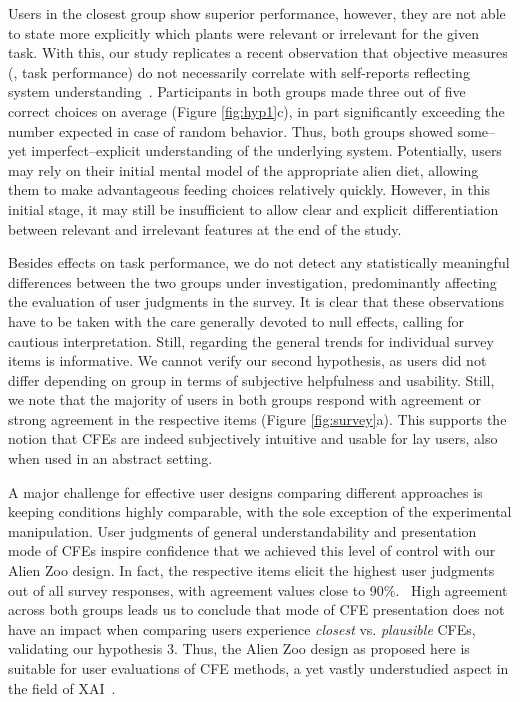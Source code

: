 Users in the closest group show superior performance, however, they are not able to state more explicitly which plants were relevant or irrelevant for the given task. 
With this, our study replicates a recent observation that objective measures (\ie, task performance) do not necessarily correlate with self-reports reflecting system understanding~\citep{van_der_waa_evaluating_2021}.
Participants in both groups made three out of five correct choices on average (Figure \ref{fig:hyp1}c), in part significantly exceeding the number expected in case of random behavior.
Thus, both groups showed some--yet imperfect--explicit understanding of the underlying system.
Potentially, users may rely on their initial mental model of the appropriate alien diet, allowing them to make advantageous feeding choices relatively quickly. However, in this initial stage, it may still be insufficient to allow clear and explicit differentiation between relevant and irrelevant features at the end of the study.

Besides effects on task performance, we do not detect any statistically meaningful differences between the two groups under investigation, predominantly affecting the evaluation of user judgments in the survey. 
It is clear that these observations have to be taken with the care generally devoted to null effects, calling for cautious interpretation. 
Still, regarding the general trends for individual survey items is informative.
We cannot verify our second hypothesis, as users did not differ depending on group in terms of subjective helpfulness and usability. 
Still, we note that the majority of users in both groups respond with agreement or strong agreement in the respective items (Figure \ref{fig:survey}a).
This supports the notion that \glspl{CFE} are indeed subjectively intuitive and usable for lay users, also when used in an abstract setting.

A major challenge for effective user designs comparing different approaches is keeping conditions highly comparable, with the sole exception of the experimental manipulation.
User judgments of general understandability and presentation mode of \glspl{CFE} inspire confidence that we achieved this level of control with our Alien Zoo design. 
In fact, the respective items elicit the highest user judgments out of all survey responses, with agreement values close to 90\%.%
~High agreement across both groups leads us to conclude that mode of \gls{CFE} presentation does not have an impact when comparing users experience \textit{closest} vs. \textit{plausible} \glspl{CFE}, validating our hypothesis 3.
Thus, the Alien Zoo design as proposed here is suitable for user evaluations of \gls{CFE} methods, a yet vastly understudied aspect in the field of \gls{XAI}~\citep{keane_if_2021}.

